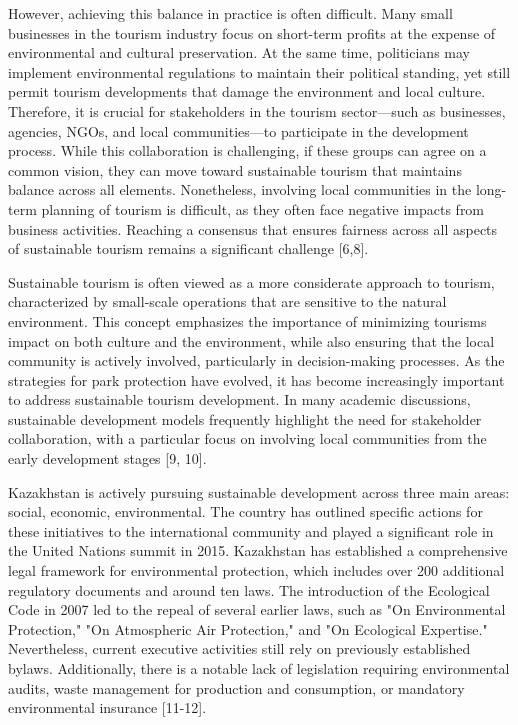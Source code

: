 \begin{multicols}{2}
However, achieving this balance in practice is often difficult. Many
small businesses in the tourism industry focus on short-term profits at
the expense of environmental and cultural preservation. At the same
time, politicians may implement environmental regulations to maintain
their political standing, yet still permit tourism developments that
damage the environment and local culture. Therefore, it is crucial for
stakeholders in the tourism sector---such as businesses, agencies, NGOs,
and local communities---to participate in the development process. While
this collaboration is challenging, if these groups can agree on a common
vision, they can move toward sustainable tourism that maintains balance
across all elements. Nonetheless, involving local communities in the
long-term planning of tourism is difficult, as they often face negative
impacts from business activities. Reaching a consensus that ensures
fairness across all aspects of sustainable tourism remains a significant
challenge {[}6,8{]}.

Sustainable tourism is often viewed as a more considerate approach to
tourism, characterized by small-scale operations that are sensitive to
the natural environment. This concept emphasizes the importance of
minimizing tourism\textquotesingle s impact on both culture and the
environment, while also ensuring that the local community is actively
involved, particularly in decision-making processes. As the strategies
for park protection have evolved, it has become increasingly important
to address sustainable tourism development. In many academic
discussions, sustainable development models frequently highlight the
need for stakeholder collaboration, with a particular focus on involving
local communities from the early development stages {[}9, 10{]}.

Kazakhstan is actively pursuing sustainable development across three
main areas: social, economic, environmental. The country has outlined
specific actions for these initiatives to the international community
and played a significant role in the United Nations summit in 2015.
Kazakhstan has established a comprehensive legal framework for
environmental protection, which includes over 200 additional regulatory
documents and around ten laws. The introduction of the Ecological Code
in 2007 led to the repeal of several earlier laws, such as "On
Environmental Protection," "On Atmospheric Air Protection," and "On
Ecological Expertise." Nevertheless, current executive activities still
rely on previously established bylaws. Additionally, there is a notable
lack of legislation requiring environmental audits, waste management for
production and consumption, or mandatory environmental insurance
{[}11-12{]}.


\end{multicols}
